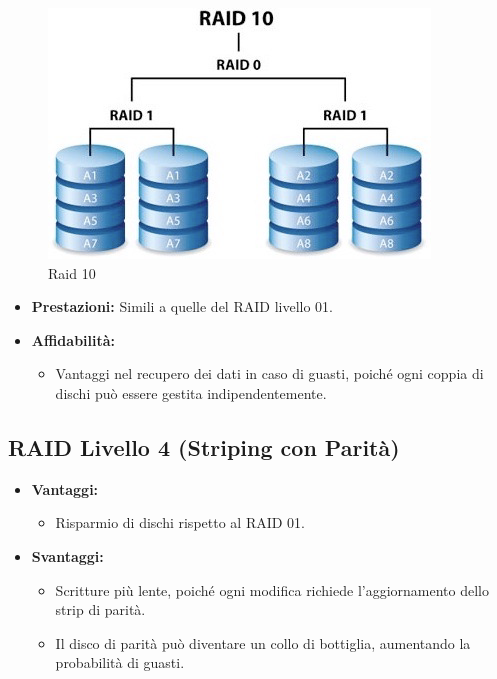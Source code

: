 \begin{figure}[h] \centering \includegraphics[width=0.50\linewidth]{images/raid_mirror10.png} \caption{Raid 10} \end{figure}

\begin{itemize}
    \item \textbf{Prestazioni:} Simili a quelle del RAID livello 01.
    \item \textbf{Affidabilità:} 
    \begin{itemize}
        \item Vantaggi nel recupero dei dati in caso di guasti, poiché ogni coppia di dischi può essere gestita indipendentemente.
    \end{itemize}
\end{itemize}

\subsection{RAID Livello 4 (Striping con Parità)}


\begin{itemize}
    \item \textbf{Vantaggi:}
    \begin{itemize}
        \item Risparmio di dischi rispetto al RAID 01.
    \end{itemize}
    \item \textbf{Svantaggi:}
    \begin{itemize}
        \item Scritture più lente, poiché ogni modifica richiede l'aggiornamento dello strip di parità.
        \item Il disco di parità può diventare un collo di bottiglia, aumentando la probabilità di guasti.
    \end{itemize}
\end{itemize}

